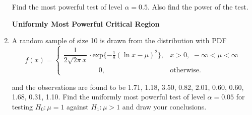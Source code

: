 \documentclass[11pt, a4paper]{article}
\begin{document}
\begin{enumerate}
\begin{table}[!htbp]
\begin{center}
\begin{tabular}{|>{\centering}m{1cm}||>{\centering}m{1cm}>{\centering}m{1cm}>{\centering}m{1cm}>{\centering}m{1cm}>{\centering\arraybackslash}m{1cm}|}
	\hline
	
	\multirow{1}{*}{$f_1(x)$} & \multirow{1}{*}{$\dfrac{1}{6}$} & \multirow{1}{*}{$\dfrac{1}{4}$} & \multirow{1}{*}{$\dfrac{1}{6}$} & \multirow{1}{*}{$\dfrac{1}{4}$} & \multirow{1}{*}{$\dfrac{1}{6}$} \\
	
	\hline
	
	\end{tabular}
	\end{center}
	\end{table}
	
	Find the most powerful test of level $\alpha = 0.5$. Also find the power of the test.
	
	
	
	
	
	




\newpage

\begin{center}

\textbf{\huge Uniformly Most Powerful Critical Region}

\end{center}


\vspace{50pt}







	
	
	
	
	\item A random sample of size 10 is drawn from the distribution with PDF
	\begin{equation*}
	 f(x) =
		\begin{cases}
		 \dfrac{1}{2\sqrt{2\pi}x} \, \cdot \text{exp}\{-\frac{1}{8}(\ln x - \mu )^2\}, & x > 0, \,\, -\infty < \mu < \infty  \\
		 \hspace{60pt} 0, & \text{otherwise}.
		\end{cases}
	\end{equation*}
	
	and the observations are found to be 1.71, 1.18, 3.50, 0.82, 2.01, 0.60, 0.60, 1.68, 0.31, 1.10. Find the uniformly most powerful test of level $\alpha = 0.05$ for testing $H_0 : \mu = 1$ against $H_1 : \mu > 1$ and draw your conclusions.
	
	
	
	
	
	
	

\vspace{50pt}







\end{enumerate}
\end{document}
